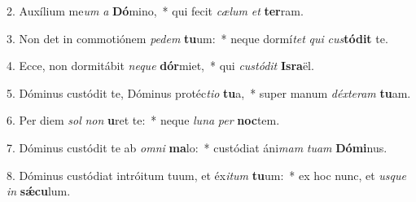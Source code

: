 2. Auxílium me\textit{um} \textit{a} \textbf{Dó}mino,~*  qui fecit \textit{cæ}\textit{lum} \textit{et} \textbf{ter}ram.\

3. Non det in commotiónem \textit{pe}\textit{dem} \textbf{tu}um:~*  neque dormí\textit{tet} \textit{qui} \textit{cus}\textbf{tó}\textbf{dit} te.\

4. Ecce, non dormitábit \textit{ne}\textit{que} \textbf{dór}miet,~*  qui \textit{cus}\textit{tó}\textit{dit} \textbf{Is}\textbf{ra}ël.\

5. Dóminus custódit te, Dóminus protéc\textit{ti}\textit{o} \textbf{tu}a,~*  super manum \textit{déx}\textit{te}\textit{ram} \textbf{tu}am.\

6. Per diem \textit{sol} \textit{non} \textbf{u}ret te:~*  neque \textit{lu}\textit{na} \textit{per} \textbf{noc}tem.\

7. Dóminus custódit te ab \textit{om}\textit{ni} \textbf{ma}lo:~*  custódiat áni\textit{mam} \textit{tu}\textit{am} \textbf{Dó}\textbf{mi}nus.\

8. Dóminus custódiat intróitum tuum, et éx\textit{i}\textit{tum} \textbf{tu}um:~*  ex hoc nunc, et \textit{us}\textit{que} \textit{in} \textbf{sǽ}\textbf{cu}lum.\

